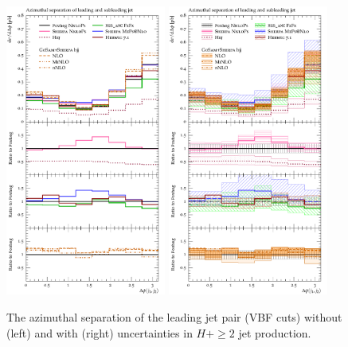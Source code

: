 {

\begin{figure}[t!]
  \centering
  \includegraphics[width=0.47\textwidth]{figures/hjetscomp_u_deltaphi_jj_VBF.pdf}
  \hfill
  \includegraphics[width=0.47\textwidth]{figures/hjetscomp_deltaphi_jj_VBF.pdf}
  \caption{
    The azimuthal separation of the leading jet pair (VBF cuts) without (left) and 
    with (right) uncertainties in $H+\ge2$ jet
    production.
    \label{fig:hjetscomp:results:VBFobs:dphijj}
  }
\end{figure}

}

